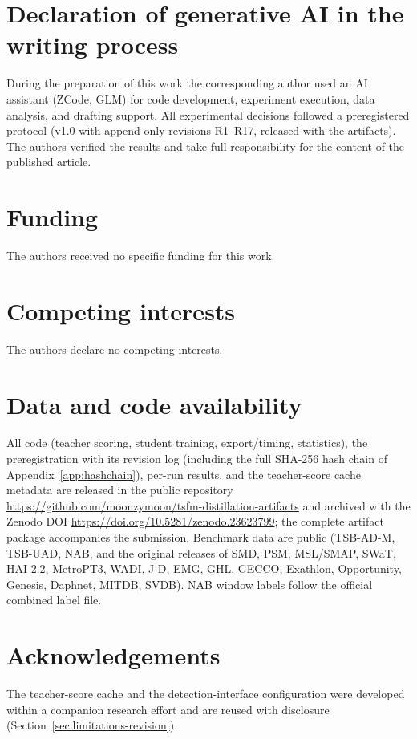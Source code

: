 \documentclass[pdflatex,sn-basic,Numbered]{sn-jnl}
\begin{document}
\section*{Declaration of generative AI in the writing process}
During the preparation of this work the corresponding author used an AI
assistant (ZCode, GLM) for code development, experiment execution, data
analysis, and drafting support. All experimental decisions followed a
preregistered protocol (v1.0 with append-only revisions R1--R17, released
with the artifacts). The authors verified the results and take full
responsibility for the content of the published article.

\section*{Funding}
The authors received no specific funding for this work.

\section*{Competing interests}
The authors declare no competing interests.

\section*{Data and code availability}
All code (teacher scoring, student training, export/timing, statistics),
the preregistration with its revision log (including the full SHA-256
hash chain of Appendix~\ref{app:hashchain}), per-run results, and the
teacher-score cache metadata are released in the public repository
\url{https://github.com/moonzymoon/tsfm-distillation-artifacts} and
archived with the Zenodo DOI
\url{https://doi.org/10.5281/zenodo.23623799}; the complete
artifact package accompanies the submission. Benchmark data are public (TSB-AD-M, TSB-UAD,
NAB, and the original releases of SMD, PSM, MSL/SMAP, SWaT, HAI 2.2,
MetroPT3, WADI, J-D, EMG, GHL, GECCO, Exathlon, Opportunity, Genesis,
Daphnet, MITDB, SVDB). NAB window labels follow the official combined
label file.

\section*{Acknowledgements}
The teacher-score cache and the detection-interface configuration were
developed within a companion research effort and are reused with
disclosure (Section~\ref{sec:limitations-revision}).
\end{document}
